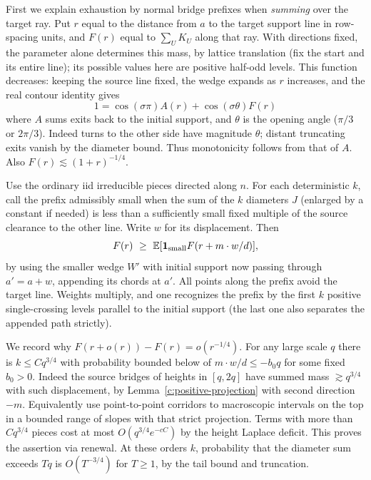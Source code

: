 \documentclass[11pt]{article}
\numberwithin{equation}{section}
\theoremstyle{definition}\newtheorem{definition}[theorem]{Definition}
\theoremstyle{remark}\newtheorem{remark}[theorem]{Remark}
\begin{document}
First we explain exhaustion by normal bridge prefixes when \emph{summing} over the target ray. Put \(r\) equal to the distance from \(a\) to the target support line in row-spacing units, and \(F(r)\) equal to \(\sum_U K_U\) along that ray. With directions fixed, the parameter alone determines this mass, by lattice translation (fix the start and its entire line); its possible values here are positive half-odd levels. This function decreases: keeping the source line fixed, the wedge expands as \(r\) increases, and the real contour identity gives
\[
 1=\cos(\sigma\pi) A(r)+\cos(\sigma\theta) F(r)
\]
where \(A\) sums exits back to the initial support, and \(\theta\) is the opening angle (\(\pi/3\) or \(2\pi/3\)). Indeed turns to the other side have magnitude \(\theta\); distant truncating exits vanish by the diameter bound. Thus monotonicity follows from that of \(A\). Also \(F(r)\lesssim(1+r)^{-1/4}\).



Use the ordinary iid irreducible pieces directed along \(n\). For each deterministic \(k\), call the prefix admissibly small when the sum of the \(k\) diameters \(J\) (enlarged by a constant if needed) is less than a sufficiently small fixed multiple of the source clearance to the other line. Write \(w\) for its displacement. Then
\[
 F(r)\ \ge\ \mathbb E[{\bf1}_{\rm small} F(r+m\cdot w/d)],
\]
by using the smaller wedge \(W'\) with initial support now passing through \(a'=a+w\), appending its chords at \(a'\). All points along the prefix avoid the target line. Weights multiply, and one recognizes the prefix by the first \(k\) positive single-crossing levels parallel to the initial support (the last one also separates the appended path strictly).



We record why \(F(r+o(r))-F(r)=o(r^{-1/4})\). For any large scale \(q\) there is \(k\le C q^{3/4}\) with probability bounded below of \(m\cdot w/d\le -b_0 q\) for some fixed \(b_0>0\). Indeed the source bridges of heights in \([q,2q]\) have summed mass \(\gtrsim q^{3/4}\) with such displacement, by Lemma~\ref{c:positive-projection} with second direction \(-m\). Equivalently use point-to-point corridors to macroscopic intervals on the top in a bounded range of slopes with that strict projection. Terms with more than \(C q^{3/4}\) pieces cost at most \(O(q^{3/4}e^{-c C})\) by the height Laplace deficit. This proves the assertion via renewal. At these orders \(k\), probability that the diameter sum exceeds \(Tq\) is \(O(T^{-3/4})\) for \(T\ge1\), by the tail bound and truncation.
\end{document}
